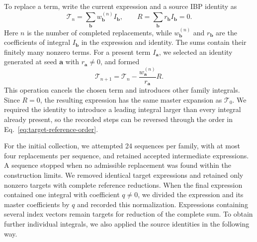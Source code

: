 \documentclass[11pt,a4paper]{article}
\begin{document}
To replace a term, write the current expression and a source
IBP identity as
\begin{equation}
 \mathcal T_n=\sum_{\boldsymbol b}w_{\boldsymbol b}^{(n)}
                         I_{\boldsymbol b},
 \qquad
 R=\sum_{\boldsymbol b}r_{\boldsymbol b}I_{\boldsymbol b}=0.
 \label{eq:target-source-row}
\end{equation}
Here $n$ is the number of completed replacements, while
$w_{\boldsymbol b}^{(n)}$ and $r_{\boldsymbol b}$ are the coefficients
of integral $I_{\boldsymbol b}$ in the expression and identity.
The sums contain their finitely many nonzero terms. For a present
term $I_{\boldsymbol a}$, we selected an identity generated at seed
$\boldsymbol a$ with $r_{\boldsymbol a}\ne0$, and formed
\begin{equation}
 \mathcal T_{n+1}
 =\mathcal T_n-\frac{w_{\boldsymbol a}^{(n)}}{r_{\boldsymbol a}}R.
 \label{eq:target-reverse-substitution}
\end{equation}
This operation cancels the chosen term and introduces other family
integrals. Since $R=0$, the resulting expression has the same master
expansion as $\mathcal T_0$. We required the identity to introduce
a leading integral larger than every integral already present, so
the recorded steps can be reversed through the order in
Eq.~\eqref{eq:target-reference-order}.

For the initial collection, we attempted 24 sequences per family,
with at most four replacements
per sequence, and retained accepted intermediate expressions.
A sequence stopped when no admissible replacement was found within
the construction limits. We removed identical target expressions and
retained only nonzero targets with complete reference reductions.
When the final expression contained one integral with coefficient
$q\ne0$, we divided the expression and its master coefficients by
$q$ and recorded this normalization. Expressions containing several
index vectors remain targets for reduction of the complete sum.
To obtain further individual integrals, we also applied the source
identities in the following way.
\end{document}

